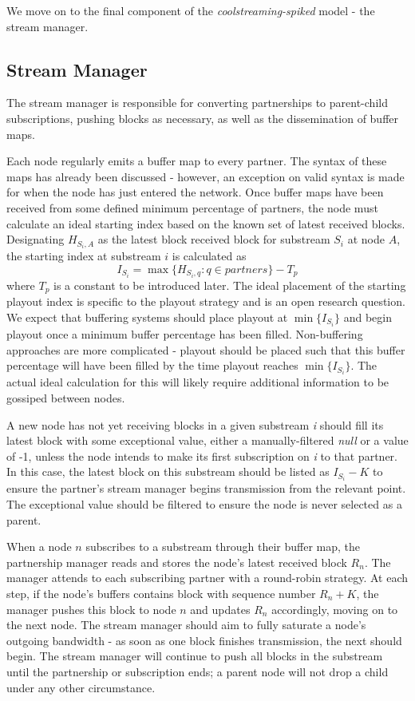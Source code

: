 \documentclass[12pt,a4paper]{article}
\begin{document}
We move on to the final component of the \textit{coolstreaming-spiked} model - the stream manager.

\subsection{Stream Manager} \label{css:stream}
The stream manager is responsible for converting partnerships to parent-child subscriptions, pushing blocks as necessary, as well as the dissemination of buffer maps.

Each node regularly emits a buffer map to every partner. The syntax of these maps has already been discussed - however, an exception on valid syntax is made for when the node has just entered the network. Once buffer maps have been received from some defined minimum percentage of partners, the node must calculate an ideal starting index based on the known set of latest received blocks. Designating \(H_{{S_i},A}\) as the latest block received block for substream \(S_i\) at node \(A\), the starting index at substream \(i\) is calculated as \[I_{S_i} = \max\{H_{{S_i},q} : q \in partners\} - T_p\] where \(T_p\) is a constant to be introduced later. The ideal placement of the starting playout index is specific to the playout strategy and is an open research question. We expect that buffering systems should place playout at \(\min\{I_{S_i}\}\) and begin playout once a minimum buffer percentage has been filled. Non-buffering approaches are more complicated - playout should be placed such that this buffer percentage will have been filled by the time playout reaches \(\min\{I_{S_i}\}\). The actual ideal calculation for this will likely require additional information to be gossiped between nodes.

A new node has not yet receiving blocks in a given substream \textit{i} should fill its latest block with some exceptional value, either a manually-filtered \textit{null} or a value of -1, unless the node intends to make its first subscription on \textit{i} to that partner. In this case, the latest block on this substream should be listed as \(I_{S_i} - K\) to ensure the partner's stream manager begins transmission from the relevant point. The exceptional value should be filtered to ensure the node is never selected as a parent. 

When a node \(n\) subscribes to a substream through their buffer map, the partnership manager reads and stores the node's latest received block \(R_n\). The manager attends to each subscribing partner with a round-robin strategy. At each step, if the node's buffers contains block with sequence number \(R_n + K\), the manager pushes this block to node \(n\) and updates \(R_n\) accordingly, moving on to the next node. The stream manager should aim to fully saturate a node's outgoing bandwidth - as soon as one block finishes transmission, the next should begin. The stream manager will continue to push all blocks in the substream until the partnership or subscription ends; a parent node will not drop a child under any other circumstance.
\end{document}
